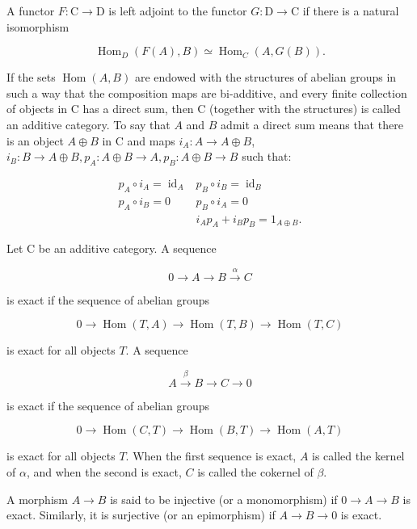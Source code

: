 \documentclass[10pt]{article}
\begin{document}
A functor $F: \mathrm{C} \rightarrow \mathrm{D}$ is left adjoint to the functor $G: \mathrm{D} \rightarrow \mathrm{C}$ if there is a natural isomorphism

$$
\operatorname{Hom}_{D}(F(A), B) \simeq \operatorname{Hom}_{C}(A, G(B)) .
$$

If the sets $\operatorname{Hom}(A, B)$ are endowed with the structures of abelian groups in such a way that the composition maps are bi-additive, and every finite collection of objects in C has a direct sum, then C (together with the structures) is called an additive category. To say that $A$ and $B$ admit a direct sum means that there is an object $A \oplus B$ in C and maps $i_{A}: A \rightarrow A \oplus B$, $i_{B}: B \rightarrow A \oplus B, p_{A}: A \oplus B \rightarrow A, p_{B}: A \oplus B \rightarrow B$ such that:

$$
\begin{array}{cc}
p_{A} \circ i_{A}=\operatorname{id}_{A} & p_{B} \circ i_{B}=\operatorname{id}_{B} \\
p_{A} \circ i_{B}=0 & p_{B} \circ i_{A}=0 \\
& i_{A} p_{A}+i_{B} p_{B}=1_{A \oplus B} .
\end{array}
$$

Let C be an additive category. A sequence

$$
0 \rightarrow A \rightarrow B \xrightarrow{\alpha} C
$$

is exact if the sequence of abelian groups

$$
0 \rightarrow \operatorname{Hom}(T, A) \rightarrow \operatorname{Hom}(T, B) \rightarrow \operatorname{Hom}(T, C)
$$

is exact for all objects $T$. A sequence

$$
A \xrightarrow{\beta} B \rightarrow C \rightarrow 0
$$

is exact if the sequence of abelian groups

$$
0 \rightarrow \operatorname{Hom}(C, T) \rightarrow \operatorname{Hom}(B, T) \rightarrow \operatorname{Hom}(A, T)
$$

is exact for all objects $T$. When the first sequence is exact, $A$ is called the kernel of $\alpha$, and when the second is exact, $C$ is called the cokernel of $\beta$.

A morphism $A \rightarrow B$ is said to be injective (or a monomorphism) if $0 \rightarrow A \rightarrow B$ is exact. Similarly, it is surjective (or an epimorphism) if $A \rightarrow B \rightarrow 0$ is exact.
\end{document}
